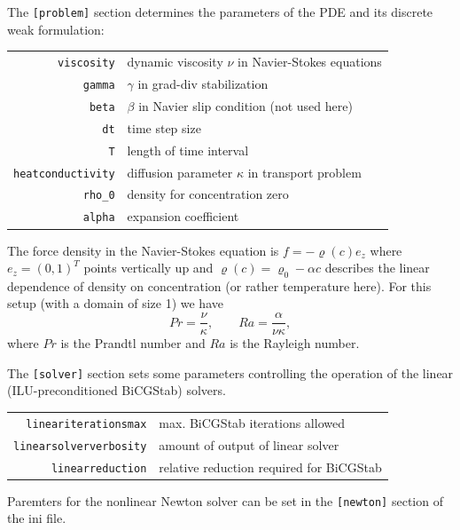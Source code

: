 \documentclass[a4paper,12pt]{article}
\theoremstyle{definition}
\begin{document}
The \lstinline{[problem]} section determines the parameters of the PDE and its discrete
weak formulation:

\begin{tabular}{rl}
\texttt{viscosity} &  dynamic viscosity $\nu$ in Navier-Stokes equations\\
\texttt{gamma} & $\gamma$ in grad-div stabilization\\
\texttt{beta} & $\beta$ in Navier slip condition (not used here)\\
\texttt{dt} & time step size\\
\texttt{T} & length of time interval\\
\texttt{heatconductivity} & diffusion parameter $\kappa$ in transport problem\\
\texttt{rho\_0} & density for concentration zero\\
\texttt{alpha} & expansion coefficient 
\end{tabular}

The force density in the Navier-Stokes equation is $f = - \varrho(c) e_z$ where $e_z=(0,1)^T$ points
vertically up and $\varrho(c) = \varrho_0 - \alpha c$ describes the linear dependence of density on
concentration (or rather temperature here). For this setup (with a domain of size 1) we have
\begin{equation*}
Pr = \frac{\nu}{\kappa}, \qquad Ra = \frac{\alpha}{\nu\kappa},
\end{equation*}
where $Pr$ is the Prandtl number and $Ra$ is the Rayleigh number.

The \lstinline{[solver]} section sets some parameters controlling the operation of the
linear (ILU-preconditioned BiCGStab) solvers.

\begin{tabular}{rl}
\texttt{lineariterationsmax} &  max. BiCGStab iterations allowed\\
\texttt{linearsolververbosity} & amount of output of linear solver\\
\texttt{linearreduction} & relative reduction required for BiCGStab
\end{tabular}

Paremters for the nonlinear Newton solver can be set in the \lstinline{[newton]} section of the
ini file.
\end{document}
